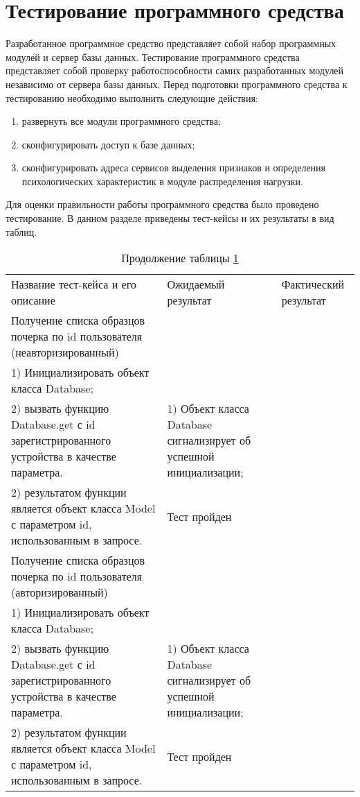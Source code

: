 \section{Тестирование программного средства}
\label{sec:testing}

Разработанное программное средство представляет собой набор программных модулей и сервер базы данных. Тестирование программного средства представляет собой проверку работоспособности самих разработанных модулей независимо от сервера базы данных. 
Перед подготовки программного средства к тестированию необходимо выполнить следующие действия:
\begin{enumerate}
  \item развернуть все модули программного средства;
  \item сконфигурировать доступ к базе данных;
  \item сконфигурировать адреса сервисов выделения признаков и определения психологических характеристик в модуле распределения нагрузки.
\end{enumerate}

Для оценки правильности работы программного средства было проведено тестирование. В данном разделе приведены тест-кейсы и их результаты в вид таблиц.

\begin{longtable}[l]{| >{\raggedright}p{}
                     | >{\raggedright}p{}
                     | >{\raggedright\arraybackslash}p{}|}
  \caption{Тестирование доступа к базе данных}
  \label{table:testing:db}\\
  \endfirsthead
  \caption*{Продолжение таблицы \ref{table:testing:db}}\\
  \endhead

  \hline
       Название тест-кейса и его описание & Ожидаемый результат & Фактический результат \\
   \hline
   Получение списка образцов почерка по id пользователя (неавторизированный) \\
   1) Инициализировать объект класса Database; \\
   2) вызвать функцию Database.get с id зарегистрированного устройства в качестве параметра.
   &
   1) Объект класса Database сигнализирует об успешной инициализации; \\
   2) результатом функции является объект класса Model с параметром id, использованным в запросе.
   &
   Тест пройден \\ \hline

   Получение списка образцов почерка по id пользователя (авторизированный) \\
   1) Инициализировать объект класса Database; \\
   2) вызвать функцию Database.get с id зарегистрированного устройства в качестве параметра.
   &
   1) Объект класса Database сигнализирует об успешной инициализации; \\
   2) результатом функции является объект класса Model с параметром id, использованным в запросе.
   &
   Тест пройден \\ \hline

\end{longtable}

